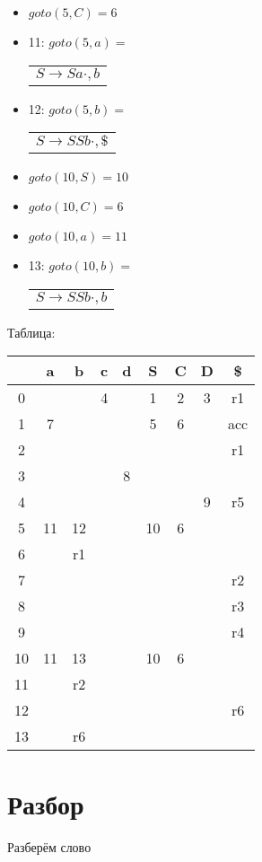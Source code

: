 \documentclass{article}
\begin{document}
\begin{itemize}
    \item $goto(5, C) = 6$
    
    \item 11: $goto(5, a) =$
    \begin{tabular}{l}
    $S \to Sa \cdot, b $ \\
    \end{tabular} 
    
    \item 12: $goto(5, b) =$
    \begin{tabular}{l}
    $S \to SSb \cdot, \$ $ \\
    \end{tabular} 
    
    \item $goto(10, S) = 10$
    
    \item $goto(10, C) = 6$
    
    \item $goto(10, a) = 11$
   
    \item 13: $goto(10, b) =$
    \begin{tabular}{l}
    $S \to SSb \cdot, b $ \\
    \end{tabular} 
    \end{itemize}
    Таблица:\\
    \begin{tabular}{c | c | c | c | c | c | c | c | c }
    & a & b & c & d & S & C & D & \$ \\
    \hline
    0 & & & 4 & & 1 & 2 & 3 & r1 \\
    1 & 7 & & & & 5 & 6 & & acc \\
    2 & & & & & & & & r1 \\
    3 & & & & 8 & & & & \\
    4 & & & & & & & 9 & r5 \\
    5 & 11 & 12 & & & 10 & 6 & & \\
    6 & & r1 & & & & & & \\
    7 & & & & & & & & r2 \\
    8 & & & & & & & & r3 \\
    9 & & & & & & & & r4 \\
    10 & 11 & 13 & & & 10 & 6 & & \\
    11 & & r2 & & & & & \\
    12 & & & & & & & & r6\\
    13 & & r6 & & & &  & \\
    \end{tabular}
    
    \section{Разбор}
    Разберём слово 
\end{document}
